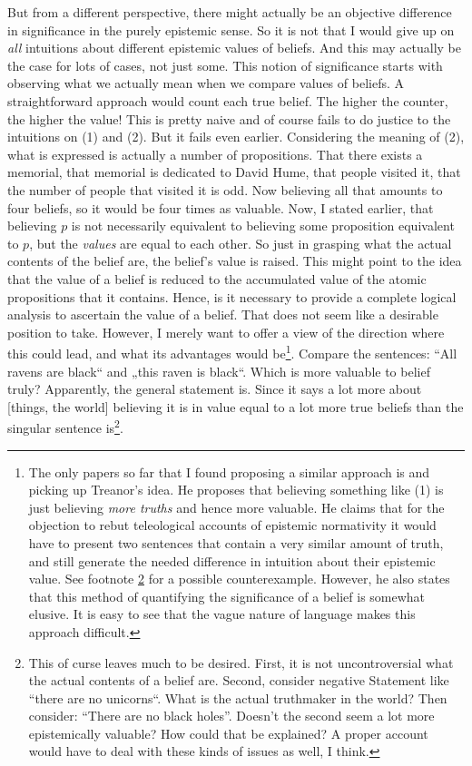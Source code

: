 \documentclass[12pt,numbers=noenddot]{scrartcl}
\begin{document}
But from a different perspective, there might actually be an objective difference in significance in the purely epistemic sense. So it is not that I would give up on \emph{all} intuitions about different epistemic values of beliefs. And this may actually be the case for lots of cases, not just some. This notion of significance starts with observing what we actually mean when we compare values of beliefs. A straightforward approach would count each true belief. The higher the counter, the higher the value! This is pretty naive and of course fails to do justice to the intuitions on (1) and (2). But it fails even earlier. Considering the meaning of (2), what is expressed is actually a number of propositions. That there exists a memorial, that memorial is dedicated to David Hume, that people visited it, that the number of people that visited it is odd. Now believing all that amounts to four beliefs, so it would be four times as valuable. Now, I stated earlier, that believing $p$ is not necessarily equivalent to believing some proposition equivalent to $p$, but the \emph{values} are equal to each other. So just in grasping what the actual contents of the belief are, the belief's value is raised. This might point to the idea that the value of a belief is reduced to the accumulated value of the atomic propositions that it contains. Hence, is it necessary to provide a complete logical analysis to ascertain the value of a belief. That does not seem like a desirable position to take. However, I merely want to offer a view of the direction where this could lead, and what its advantages would be\footnote{The only papers so far that I found proposing a similar approach is \textcite{Treanor2014-TRETTA} and \textcite{Pritchard2014} picking up Treanor's idea. He proposes that believing something like (1) is just believing \emph{more truths} and hence more valuable. He claims that for the objection to rebut teleological accounts of epistemic normativity it would have to present two sentences that contain a very similar amount of truth, and still generate the needed difference in intuition about their epistemic value. See footnote \ref{foot:noblackholes} for a possible counterexample. However, he also states that this method of quantifying the significance of a belief is somewhat elusive. It is easy to see that the vague nature of language makes this approach difficult.}.
Compare the sentences: “All ravens are black“ and „this raven is black“. Which is more valuable to belief truly? Apparently, the general statement is. Since it says a lot more about [things, the world] believing it  is in value equal to a lot more true beliefs than the singular sentence is\footnote{\label{foot:noblackholes}This of curse leaves much to be desired. First, it is not uncontroversial what the actual contents of a belief are. Second, consider negative Statement like “there are no unicorns“. What is the actual truthmaker in the world? Then consider: “There are no black holes”. Doesn't the second seem a lot more epistemically valuable? How could that be explained? A proper account would have to deal with these kinds of issues as well, I think.}.
\end{document}
